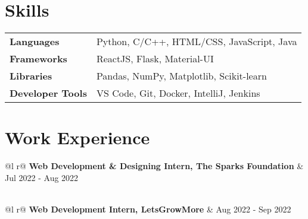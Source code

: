 \documentclass[a4paper,12pt]{article}
\begin{document}
\section{Skills}
\begin{tabularx}{\linewidth}{@{}l X@{}}
\textbf{Languages} &  \normalsize{Python, C/C++, HTML/CSS, JavaScript, Java}\\ [3.75pt]
\textbf{Frameworks}  &  \normalsize{ReactJS, Flask, Material-UI}\\ [3.75pt]
\textbf{Libraries}  &  \normalsize{Pandas, NumPy, Matplotlib, Scikit-learn}\\ [3.75pt]
\textbf{Developer Tools}  &  \normalsize{VS Code, Git, Docker, IntelliJ, Jenkins}\\ 
\end{tabularx}


\section{Work Experience}

\begin{tabularx}{\linewidth}{ @{}l r@{} }
\textbf{Web Development \& Designing Intern, The Sparks Foundation} & \hfill Jul 2022 - Aug 2022 \\[3.75pt]
\\
\end{tabularx}

\begin{tabularx}{\linewidth}{ @{}l r@{} }
\textbf{Web Development Intern, LetsGrowMore} & \hfill Aug 2022 - Sep 2022 \\[3.75pt]
\end{tabularx}
\end{document}

